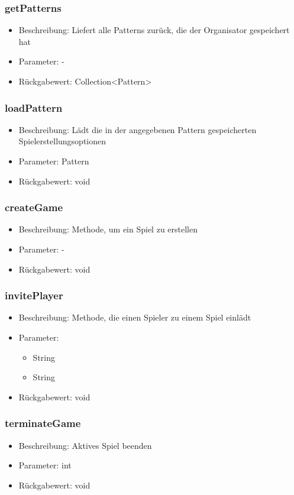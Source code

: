 \documentclass[a4paper]{scrreprt}
\begin{document}
    \subsubsection{getPatterns}
    \begin{itemize}
        \item Beschreibung: Liefert alle Patterns zurück, die der Organisator gespeichert hat
        \item Parameter: -
        \item Rückgabewert: Collection<Pattern>
    \end{itemize}
    \subsubsection{loadPattern}
    \begin{itemize}
        \item Beschreibung: Lädt die in der angegebenen Pattern gespeicherten Spielerstellungsoptionen
        \item Parameter: Pattern
        \item Rückgabewert: void
    \end{itemize}
    \subsubsection{createGame}
    \begin{itemize}
        \item Beschreibung: Methode, um ein Spiel zu erstellen
        \item Parameter: -
        \item Rückgabewert: void
    \end{itemize}
    \subsubsection{invitePlayer}
    \begin{itemize}
        \item Beschreibung: Methode, die einen Spieler zu einem Spiel einlädt
        \item Parameter:
        \begin{itemize}
            \item String
            \item String
        \end{itemize}
        \item Rückgabewert: void
    \end{itemize}
    \subsubsection{terminateGame}
    \begin{itemize}
        \item Beschreibung: Aktives Spiel beenden
        \item Parameter: int
        \item Rückgabewert: void
    \end{itemize}
\end{document}
